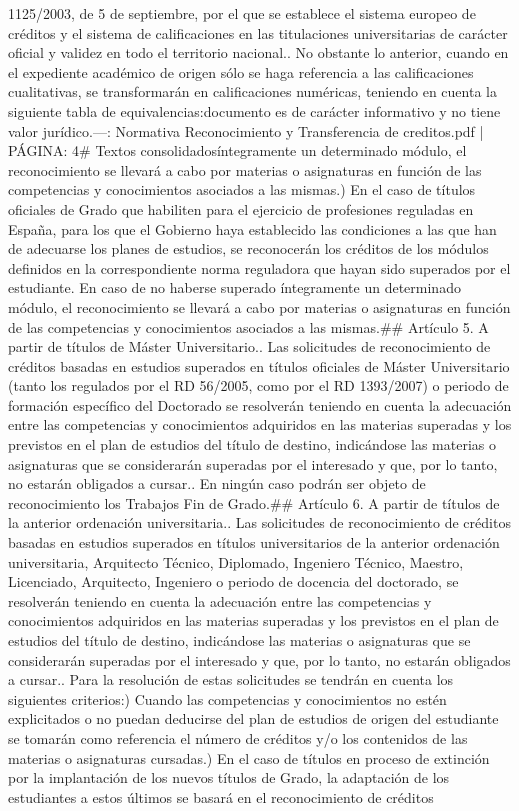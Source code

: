 \documentclass{article}
\begin{document}
\begin{itemize}
1125/2003, de 5 de septiembre, por el que se establece el sistema europeo de créditos y el sistema de calificaciones en las titulaciones universitarias de carácter oficial y validez en todo el territorio nacional.\n{}. No obstante lo anterior, cuando en el expediente académico de origen sólo se haga referencia a las calificaciones cualitativas, se transformarán en calificaciones numéricas, teniendo en cuenta la siguiente tabla de equivalencias:\n\nEste documento es de carácter informativo y no tiene valor jurídico.\n\n---\n\nFUENTE: Normativa Reconocimiento y Transferencia de creditos.pdf | PÁGINA: 4\n# Textos consolidados\n\nsuperado íntegramente un determinado módulo, el reconocimiento se llevará a cabo por materias o asignaturas en función de las competencias y conocimientos asociados a las mismas.\n{}) En el caso de títulos oficiales de Grado que habiliten para el ejercicio de profesiones reguladas en España, para los que el Gobierno haya establecido las condiciones a las que han de adecuarse los planes de estudios, se reconocerán los créditos de los módulos definidos en la correspondiente norma reguladora que hayan sido superados por el estudiante. En caso de no haberse superado íntegramente un determinado módulo, el reconocimiento se llevará a cabo por materias o asignaturas en función de las competencias y conocimientos asociados a las mismas.\n\n## Artículo 5. A partir de títulos de Máster Universitario.\n{}. Las solicitudes de reconocimiento de créditos basadas en estudios superados en títulos oficiales de Máster Universitario (tanto los regulados por el RD 56/2005, como por el RD 1393/2007) o periodo de formación específico del Doctorado se resolverán teniendo en cuenta la adecuación entre las competencias y conocimientos adquiridos en las materias superadas y los previstos en el plan de estudios del título de destino, indicándose las materias o asignaturas que se considerarán superadas por el interesado y que, por lo tanto, no estarán obligados a cursar.\n{}. En ningún caso podrán ser objeto de reconocimiento los Trabajos Fin de Grado.\n\n## Artículo 6. A partir de títulos de la anterior ordenación universitaria.\n{}. Las solicitudes de reconocimiento de créditos basadas en estudios superados en títulos universitarios de la anterior ordenación universitaria, Arquitecto Técnico, Diplomado, Ingeniero Técnico, Maestro, Licenciado, Arquitecto, Ingeniero o periodo de docencia del doctorado, se resolverán teniendo en cuenta la adecuación entre las competencias y conocimientos adquiridos en las materias superadas y los previstos en el plan de estudios del título de destino, indicándose las materias o asignaturas que se considerarán superadas por el interesado y que, por lo tanto, no estarán obligados a cursar.\n{}. Para la resolución de estas solicitudes se tendrán en cuenta los siguientes criterios:\n{}) Cuando las competencias y conocimientos no estén explicitados o no puedan deducirse del plan de estudios de origen del estudiante se tomarán como referencia el número de créditos y/o los contenidos de las materias o asignaturas cursadas.\n{}) En el caso de títulos en proceso de extinción por la implantación de los nuevos títulos de Grado, la adaptación de los estudiantes a estos últimos se basará en el reconocimiento de créditos 
\end{itemize}
\end{document}
